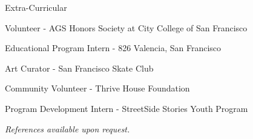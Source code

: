\documentclass{resume} %
\begin{document}

\begin{rSection}{Extra-Curricular} \itemsep -3pt

\item Volunteer - AGS Honors Society at City College of San Francisco
\item Educational Program Intern - 826 Valencia, San Francisco
\item Art Curator - San Francisco Skate Club
\item Community Volunteer - Thrive House Foundation
\item Program Development Intern - StreetSide Stories Youth Program

\end{rSection}


\begin{rSection}

\centering \em References available upon request.

\end{rSection}
\end{document}
